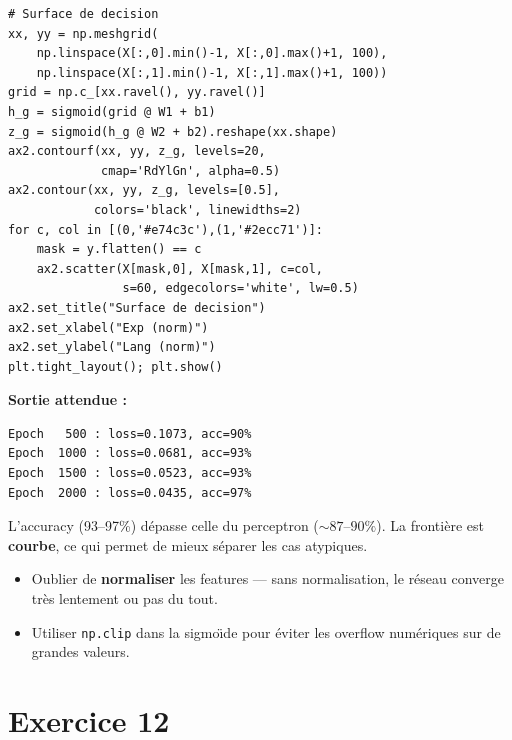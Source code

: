 \begin{pythonbox}
\begin{lstlisting}
# Surface de decision
xx, yy = np.meshgrid(
    np.linspace(X[:,0].min()-1, X[:,0].max()+1, 100),
    np.linspace(X[:,1].min()-1, X[:,1].max()+1, 100))
grid = np.c_[xx.ravel(), yy.ravel()]
h_g = sigmoid(grid @ W1 + b1)
z_g = sigmoid(h_g @ W2 + b2).reshape(xx.shape)
ax2.contourf(xx, yy, z_g, levels=20,
             cmap='RdYlGn', alpha=0.5)
ax2.contour(xx, yy, z_g, levels=[0.5],
            colors='black', linewidths=2)
for c, col in [(0,'#e74c3c'),(1,'#2ecc71')]:
    mask = y.flatten() == c
    ax2.scatter(X[mask,0], X[mask,1], c=col,
                s=60, edgecolors='white', lw=0.5)
ax2.set_title("Surface de decision")
ax2.set_xlabel("Exp (norm)")
ax2.set_ylabel("Lang (norm)")
plt.tight_layout(); plt.show()
\end{lstlisting}
\end{pythonbox}

\textbf{Sortie attendue :}
\begin{verbatim}
Epoch   500 : loss=0.1073, acc=90%
Epoch  1000 : loss=0.0681, acc=93%
Epoch  1500 : loss=0.0523, acc=93%
Epoch  2000 : loss=0.0435, acc=97%
\end{verbatim}

L'accuracy (93--97\%) d\'{e}passe celle du perceptron (${\sim}87$--$90\%$). La fronti\`{e}re est \textbf{courbe}, ce qui permet de mieux s\'{e}parer les cas atypiques.

\begin{attentionbox}
\begin{itemize}
    \item Oublier de \textbf{normaliser} les features --- sans normalisation, le r\'{e}seau converge tr\`{e}s lentement ou pas du tout.
    \item Utiliser \texttt{np.clip} dans la sigmo\"{\i}de pour \'{e}viter les overflow num\'{e}riques sur de grandes valeurs.
\end{itemize}
\end{attentionbox}

\section*{Exercice 12 \hfill \exoavance}

\separateur

